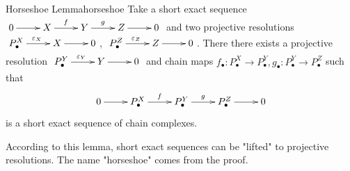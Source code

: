 \documentclass[twoside = false,	%
		headsepline,		%
		parskip = true,
		]{scrbook}						%
\begin{document}
    \begin{lemma}{Horseshoe Lemma}{horseshoe}
        Take a short exact sequence $\xymatrix{0 \ar[r]& X\ar[r]^{f} & Y\ar[r]^g & Z\ar[r] & 0}$ and two projective resolutions $\xymatrix {P_\bullet^X \ar[r]^{\e_X} & X \ar[r] & 0}$, $\xymatrix {P_\bullet^Z \ar[r]^{\e_Z} & Z \ar[r] & 0}$. There there exists a projective resolution $\xymatrix {P_\bullet^Y \ar[r]^{\e_Y} & Y \ar[r] & 0}$ and chain maps $f_\bullet:P_\bullet^X \to P_\bullet^Y, g_\bullet: P_\bullet^Y \to P_\bullet^Z$ such that
        \begin{equation*}
        \xymatrix {
            0 \ar[r]& P_\bullet^X \ar[r]^f & \ar[r]^g P_\bullet^Y & P_\bullet^Z \ar[r] & 0 
        }
        \end{equation*} is a short exact sequence of chain complexes.
    \end{lemma}
    According to this lemma, short exact sequences can be "lifted" to projective resolutions. The name "horseshoe" comes from the proof.
    
\end{document}
